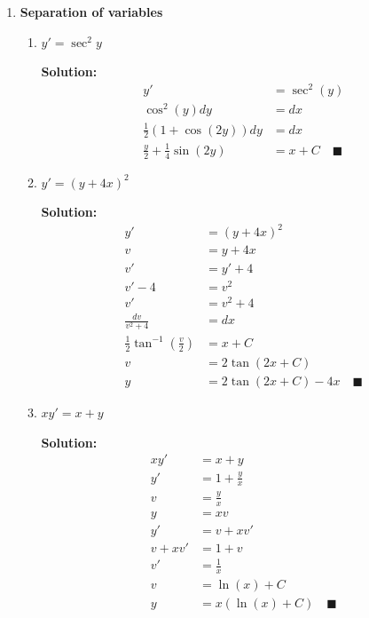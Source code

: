 \documentclass[letterpaper, fontsize=12pt]{scrartcl} %
\numberwithin{equation}{section} %
\numberwithin{figure}{section} %
\numberwithin{table}{section} %
\begin{document}
\begin{enumerate}


\item \textbf{Separation of variables}
\begin{enumerate}[label = (\alph*)]
\item $y ' = \sec^2 y$

\par \textbf{Solution:}
\begin{align*}
y' &= \sec^2( y) \\
\cos^2(y)dy &= dx \\
\frac{1}{2} (1 + \cos(2y))dy &= dx \\
\frac{y}{2} + \frac{1}{4} \sin(2y) &= x + C \quad\blacksquare
\end{align*}

\item $y' = (y + 4x)^2$

\par \textbf{Solution:}
\begin{align*}
y' &= (y + 4x)^2 \\
v &= y + 4x \\
v' &= y' + 4 \\
v' - 4 &= v^2 \\
v' &= v^2 + 4 \\
\frac{dv}{v^2 + 4} &= dx \\
\frac{1}{2} \tan^{-1} \left( \frac{v}{2}\right) &= x + C \\
v &= 2\tan(2x + C) \\
y &= 2\tan(2x + C) - 4x \quad\blacksquare 
\end{align*}

\item $xy' = x + y$

\par \textbf{Solution:}
\begin{align*}
xy' &= x + y \\
y' &= 1 + \frac{y}{x} \\
v &= \frac{y}{x} \\
y &= xv \\
y' &= v + x v' \\
v + x v' &= 1 + v \\
v' &= \frac{1}{x} \\
v &= \ln(x) + C\\
y &= x(\ln(x) + C) \quad\blacksquare
\end{align*}

\end{enumerate}



\end{enumerate}
\end{document}
